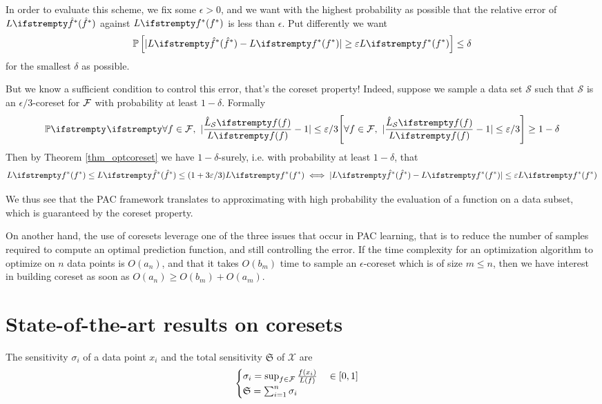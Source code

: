 In order to evaluate this scheme, we fix some $\epsilon>0$, and we want with the highest probability as possible that the relative error of $\loss{\hat\query^*}$ against $\loss{\query^*}$ is less than $\epsilon$. Put differently we want
\begin{equation*}
	\mathbb{P}\left[|\loss{\hat\query^*} - \loss{\query^*}| \ge \epsilon \loss{\query^*}\right] \leq \delta
\end{equation*}
for the smallest $\delta$ as possible.

But we know a sufficient condition to control this error, that's the coreset property! Indeed, suppose we sample a data set $\mathcal{S}$ such that $\mathcal{S}$ is an $\epsilon/3$-coreset for $\mathcal{F}$ with probability at least $1-\delta$. Formally
\begin{equation*}
    \PP{}{\forall f \in \queryset,\ |\frac{\estloss{\mathcal{S}}{\query}}{\loss{\query}} - 1| \leq \epsilon/3} \geq 1- \delta
\end{equation*}
Then by Theorem \ref{thm_optcoreset} we have $1-\delta$-surely, i.e. with probability at least $1-\delta$, that
\begin{equation*}
    \loss{\query^*} \leq \loss{\hat\query^*} \leq (1+ 3 \epsilon/3) \loss{\query^*} \iff
    |\loss{\hat\query^*} - \loss{\query^*}| \leq \epsilon \loss{\query^*}
\end{equation*}

We thus see that the PAC framework translates to approximating with high probability the evaluation of a function on a data subset, which is guaranteed by the coreset property. 

On another hand, the use of coresets leverage one of the three issues that occur in PAC learning, that is to reduce the number of samples required to compute an optimal prediction function, and still controlling the error. If the time complexity for an optimization algorithm to optimize on $n$ data points is $O(a_n)$, and that it takes $O(b_m)$ time to sample an $\epsilon$-coreset which is of size $m \le n$, then we have interest in building coreset as soon as $O(a_n) \geq O(b_m) + O(a_m)$.







\section{State-of-the-art results on coresets}
\begin{definition}[Sensitivity]
	The sensitivity $\sigma_i$ of a data point $x_{i}$ and the total sensitivity $\mathfrak S$ of $\mathcal X$ are
	$$
	\begin{cases}
		\sigma_{i}= \sup _{f \in \mathcal{F}} \frac{{f}\left(x_{i}\right)}{L(f)} \quad \in[0,1]\\
		\mathfrak{S}=\sum_{i=1}^{n} \sigma_{i}
	\end{cases}
	$$
\end{definition} 

